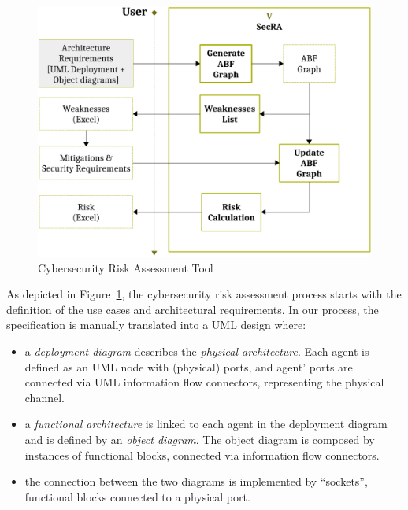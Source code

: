 \documentclass[conference]{IEEEtran}
\begin{document}
\begin{figure}
	\centering
	\includegraphics[width=.9\columnwidth]{v-secra.pdf}
	\caption{Cybersecurity Risk Assessment Tool}
	\label{fig:secra}
\end{figure}
As depicted in Figure~\ref{fig:secra}, the cybersecurity risk assessment process
starts with the definition of the use cases and architectural requirements.  In our process, the specification is manually
translated into a UML design where:
\begin{itemize}
	\item a \emph{deployment diagram} describes the \emph{physical
		architecture}. Each agent is defined as an UML node with (physical)
		ports, and agent' ports are connected via UML information flow
		connectors, representing the physical channel.
	\item a \emph{functional architecture} is linked to each agent in the
		deployment diagram and is defined by an \emph{object diagram}.
		The object diagram is composed by instances of functional
		blocks, connected via information flow connectors.
	\item the connection between the two diagrams is implemented by
		``sockets'', functional blocks connected to a 
		physical port.
\end{itemize}
\end{document}
